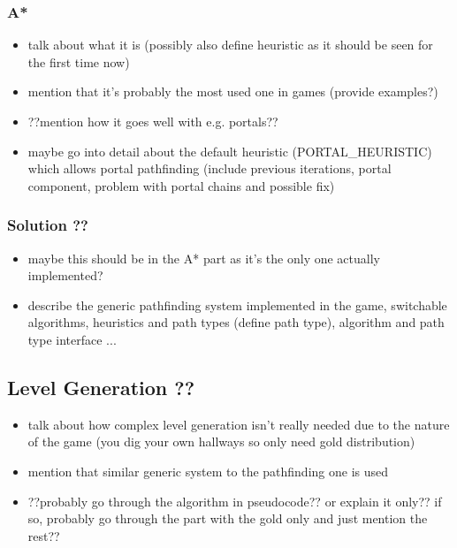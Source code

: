 \subsubsection{A*}

\begin{itemize}
	\item talk about what it is (possibly also define heuristic as it should
		be seen for the first time now)
	\item mention that it's probably the most used one in games (provide examples?)
	\item ??mention how it goes well with e.g. portals??
	\item maybe go into detail about the default heuristic (PORTAL\_HEURISTIC) which
		allows portal pathfinding (include previous iterations, portal component,
		problem with portal chains and possible fix)
\end{itemize}

\subsubsection{Solution ??}

\begin{itemize}
    \item maybe this should be in the A* part as it's the only one actually implemented?
    \item describe the generic pathfinding system implemented in the game, switchable
	    algorithms, heuristics and path types (define path type),
	    algorithm and path type interface ...
\end{itemize}

\subsection{Level Generation ??}

\begin{itemize}
    \item talk about how complex level generation isn't really needed due
	    to the nature of the game (you dig your own hallways so only need
	    gold distribution)
    \item mention that similar generic system to the pathfinding one is used
    \item ??probably go through the algorithm in pseudocode?? or explain it only??
	    if so, probably go through the part with the gold only and just mention
	    the rest??
\end{itemize}


